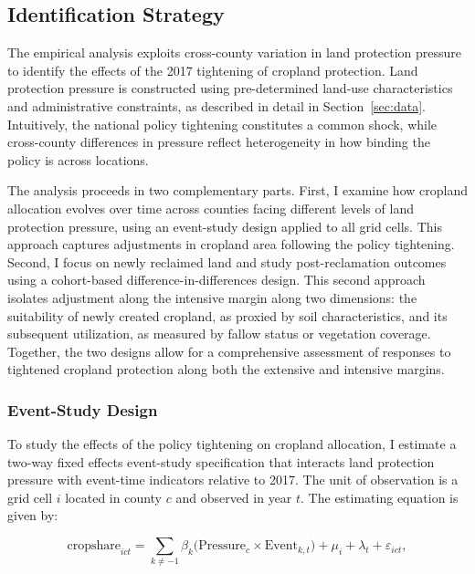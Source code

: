 
\subsection{Identification Strategy}

The empirical analysis exploits cross-county variation in land protection pressure to identify the effects of the 2017 tightening of cropland protection. Land protection pressure is constructed using pre-determined land-use characteristics and administrative constraints, as described in detail in Section~\ref{sec:data}. Intuitively, the national policy tightening constitutes a common shock, while cross-county differences in pressure reflect heterogeneity in how binding the policy is across locations. 

The analysis proceeds in two complementary parts. First, I examine how cropland allocation evolves over time across counties facing different levels of land protection pressure, using an event-study design applied to all grid cells. This approach captures adjustments in cropland area following the policy tightening. Second, I focus on newly reclaimed land and study post-reclamation outcomes using a cohort-based difference-in-differences design. This second approach isolates adjustment along the intensive margin along two dimensions: the suitability of newly created cropland, as proxied by soil characteristics, and its subsequent utilization, as measured by fallow status or vegetation coverage. Together, the two designs allow for a comprehensive assessment of responses to tightened cropland protection along both the extensive and intensive margins.


\subsubsection{Event-Study Design}

To study the effects of the policy tightening on cropland allocation, I estimate a two-way fixed effects event-study specification that interacts land protection pressure with event-time indicators relative to 2017. The unit of observation is a grid cell $i$ located in county $c$ and observed in year $t$. The estimating equation is given by:

\begin{equation}
    \text{cropshare}_{ict}
    =
    \sum_{k \neq -1}
    \beta_k
    \big(
        \text{Pressure}_{c} 
        \times 
        \text{Event}_{k,t}
    \big)
    +
    \mu_i
    +
    \lambda_t
    +
    \varepsilon_{ict},
\end{equation}

